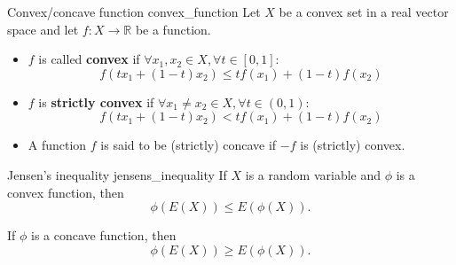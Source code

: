 \begin{definition}{Convex/concave function \cite{math2901_notes}}{convex_function}
	Let $X$ be a convex set in a real vector space and let $f : X \to \mathbb{R}$ be a function.
	\begin{itemize}
		\item $f$ is called \textbf{convex} if $\forall x_1, x_2 \in X, \forall t \in [0, 1]$:
		$$ f(t x_1 + (1 - t) x_2) \leq t f(x_1) + (1 - t) f(x_2) $$

		\item $f$ is \textbf{strictly convex} if $\forall x_1 \neq x_2 \in X, \forall t \in (0, 1)$:
		$$ f(t x_1 + (1 - t) x_2) < t f(x_1) + (1 - t) f(x_2) $$

		\item A function $f$ is said to be (strictly) concave if $-f$ is (strictly) convex.
	\end{itemize}	
\end{definition}

\begin{lemma}{Jensen's inequality \cite{wikipedia_jensens_inequality}}{jensens_inequality}
	If $X$ is a random variable and $\phi$ is a convex function, then
	$$ \phi(E(X)) \leq E(\phi(X)) . $$

	If $\phi$ is a concave function, then
	$$ \phi(E(X)) \geq E(\phi(X)) . $$
\end{lemma}